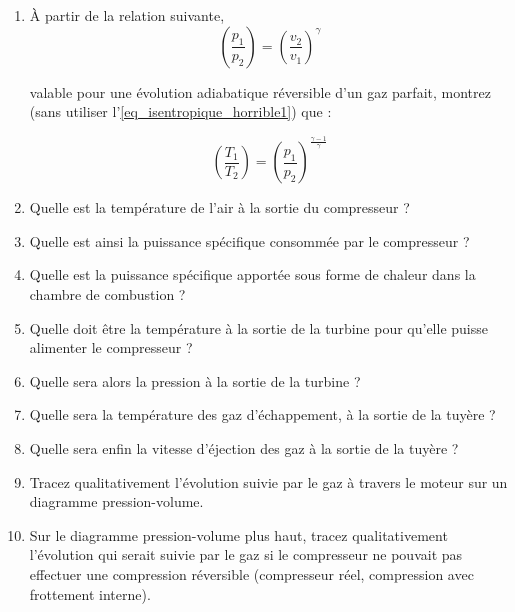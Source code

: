 	\begin{enumerate}
		\item À partir de la relation suivante,
			\begin{equation*}
				\left( \frac{p_1}{p_2} \right)	= \left( \frac{v_2}{v_1} \right)^{\gamma}
			\end{equation*}
							
			valable pour une évolution adiabatique réversible d’un gaz parfait, montrez (sans utiliser l’\cref{eq_isentropique_horrible1}) que :
			
			\begin{equation*}
				\left( \frac{T_1}{T_2} \right)	=  \left( \frac{p_1}{p_2} \right)^{\frac{\gamma -1}{\gamma}}
			\end{equation*}
			
		\item Quelle est la température de l’air à la sortie du compresseur ?
		\item Quelle est ainsi la puissance spécifique consommée par le compresseur ?
		\item Quelle est la puissance spécifique apportée sous forme de chaleur dans la chambre de combustion ?
		\item Quelle doit être la température à la sortie de la turbine pour qu’elle puisse alimenter le compresseur ?
		\item Quelle sera alors la pression à la sortie de la turbine ?
		\item Quelle sera la température des gaz d’échappement, à la sortie de la tuyère ?
		\item Quelle sera enfin la vitesse d’éjection des gaz à la sortie de la tuyère ?
		\item Tracez qualitativement l’évolution suivie par le gaz à travers le moteur sur un diagramme pression-volume.
		\item Sur le diagramme pression-volume plus haut, tracez qualitativement l’évolution qui serait suivie par le gaz si le compresseur ne pouvait pas effectuer une compression réversible (compresseur réel, compression avec frottement interne).
	\end{enumerate}


\exercisesolutionpage
\titreresultats
	\linktosolutionsblurb

